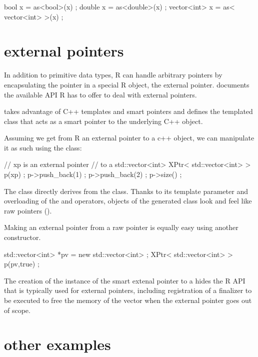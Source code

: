 \begin{example}
bool x = as<bool>(x) ;
double x = as<double>(x) ;
vector<int> x = as< vector<int> >(x) ;
\end{example}

\section{external pointers}

In addition to primitive data types, R can handle arbitrary pointers
by encapsulating the pointer in a special R object, the external 
pointer. \cite{R:exts} documents the available API R has to offer to 
deal with external pointers. 

 takes advantage of C++ templates and smart pointers and 
defines the templated class  that acts as a smart 
pointer to the underlying C++ object. 

Assuming we get from R an external pointer to a 
c++ object, we can manipulate it as such using the  class:

\begin{example}
// xp is an external pointer 
// to a std::vector<int>
XPtr< std::vector<int> > p(xp) ;
p->push\_back(1) ;
p->push\_back(2) ;
p->size() ; 
\end{example}

The  class directly derives from the  class.
Thanks to its template parameter and overloading of the \code{->} 
and \code{*} operators, objects of the  generated
class look and feel like raw pointers ().

Making an external pointer from a raw pointer is equally easy using 
another constructor. 

\begin{example}
std::vector<int> *pv = new std::vector<int> ;
XPtr< std::vector<int> > p(pv,true) ;
\end{example}

The creation of the instance of the  
smart extenal pointer to a  hides the 
R API that is typically used for external pointers, including registration
of a finalizer to be executed to free the memory of the vector when the
external pointer goes out of scope. 

\section{other examples}

